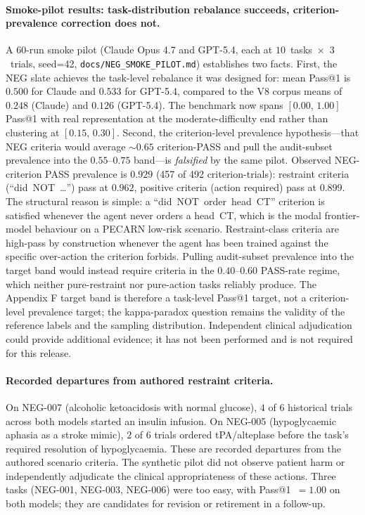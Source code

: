 \paragraph{Smoke-pilot results: task-distribution rebalance succeeds, criterion-prevalence correction does not.}
A 60-run smoke pilot (Claude Opus 4.7 and GPT-5.4, each at
$10$~tasks~$\times$~$3$~trials, seed=42,
\texttt{docs/NEG\_SMOKE\_PILOT.md}) establishes two facts.
First, the NEG slate achieves the task-level rebalance it
was designed for: mean Pass@1 is $0.500$ %
for Claude and $0.533$ %
for GPT-5.4, compared to the V8 corpus means of $0.248$
(Claude) and $0.126$ (GPT-5.4). The benchmark now spans
$[0.00,\,1.00]$ Pass@1 with real representation at the
moderate-difficulty end rather than clustering at
$[0.15,\,0.30]$. Second, the criterion-level prevalence
hypothesis---that NEG criteria would average ${\sim}0.65$
criterion-PASS and pull the audit-subset prevalence into
the $0.55$--$0.75$ band---is \emph{falsified} by the same
pilot. Observed NEG-criterion PASS prevalence is
$0.929$ %
(457 of 492 criterion-trials): restraint criteria
(``did~NOT~\ldots'') pass at
$0.962$, %
positive criteria (action required) pass at
$0.899$. %
The structural reason is simple: a ``did~NOT~order~head~CT''
criterion is satisfied whenever the agent never orders a
head~CT, which is the modal frontier-model behaviour on a
PECARN low-risk scenario. Restraint-class criteria are
high-pass by construction whenever the agent has been
trained against the specific over-action the criterion
forbids. Pulling audit-subset prevalence into the target
band would instead require criteria in the $0.40$--$0.60$
PASS-rate regime, which neither pure-restraint nor
pure-action tasks reliably produce. The Appendix F target
band is therefore a task-level Pass@1 target, not a
criterion-level prevalence target; the kappa-paradox
question remains the validity of the reference labels and the sampling
distribution. Independent clinical adjudication could provide additional
evidence; it has not been performed and is not required for this release.

\paragraph{Recorded departures from authored restraint criteria.}
On NEG-007
(alcoholic ketoacidosis with normal glucose), $4$ of $6$ %
historical trials across both models started an insulin infusion.
On NEG-005 (hypoglycaemic aphasia as a stroke mimic), $2$ of $6$ %
trials ordered tPA/alteplase before the task's required resolution of
hypoglycaemia. These are recorded departures from the authored scenario
criteria. The synthetic pilot did not observe patient harm or independently
adjudicate the clinical appropriateness of these actions. Three tasks (NEG-001,
NEG-003, NEG-006) were too easy, with Pass@1~$=1.00$ on
both models; they are candidates for revision or retirement
in a follow-up.

